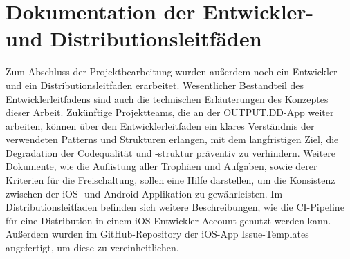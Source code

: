 \section{Dokumentation der Entwickler- und Distributionsleitfäden}

Zum Abschluss der Projektbearbeitung wurden außerdem noch ein Entwickler- und ein Distributionsleitfaden erarbeitet. Wesentlicher Bestandteil des Entwicklerleitfadens sind auch die technischen Erläuterungen des Konzeptes dieser Arbeit. Zukünftige Projektteams, die an der OUTPUT.DD-App weiter arbeiten, können über den Entwicklerleitfaden ein klares Verständnis der verwendeten Patterns und Strukturen erlangen, mit dem langfristigen Ziel, die Degradation der Codequalität und -struktur präventiv zu verhindern. Weitere Dokumente, wie die Auflistung aller Trophäen und Aufgaben, sowie derer Kriterien für die Freischaltung, sollen eine Hilfe darstellen, um die Konsistenz zwischen der iOS- und Android-Applikation zu gewährleisten. Im Distributionsleitfaden befinden sich weitere Beschreibungen, wie die CI-Pipeline für eine Distribution in einem iOS-Entwickler-Account genutzt werden kann. Außerdem wurden im GitHub-Repository der iOS-App Issue-Templates angefertigt, um diese zu vereinheitlichen.
